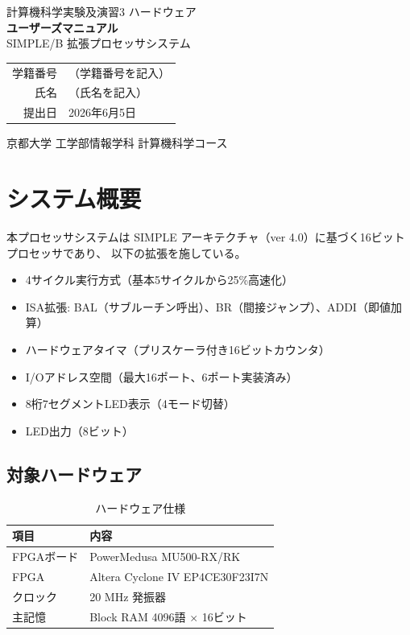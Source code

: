 \documentclass[a4paper,11pt]{ltjsarticle}
\begin{document}
\begin{titlepage}
\centering
\vspace*{3cm}
{\LARGE 計算機科学実験及演習3 ハードウェア}\\[1cm]
{\Huge\bfseries ユーザーズマニュアル}\\[0.5cm]
{\LARGE SIMPLE/B 拡張プロセッサシステム}\\[3cm]
\begin{tabular}{rl}
学籍番号 & （学籍番号を記入） \\[0.5em]
氏名     & （氏名を記入） \\[0.5em]
提出日   & 2026年6月5日 \\
\end{tabular}
\vfill
京都大学 工学部情報学科 計算機科学コース
\end{titlepage}

\tableofcontents
\clearpage


\section{システム概要}

本プロセッサシステムは SIMPLE アーキテクチャ（ver 4.0）に基づく16ビットプロセッサであり、
以下の拡張を施している。

\begin{itemize}
\item 4サイクル実行方式（基本5サイクルから25\%高速化）
\item ISA拡張: BAL（サブルーチン呼出）、BR（間接ジャンプ）、ADDI（即値加算）
\item ハードウェアタイマ（プリスケーラ付き16ビットカウンタ）
\item I/Oアドレス空間（最大16ポート、6ポート実装済み）
\item 8桁7セグメントLED表示（4モード切替）
\item LED出力（8ビット）
\end{itemize}

\subsection{対象ハードウェア}

\begin{table}[h]
\centering
\caption{ハードウェア仕様}
\begin{tabular}{ll}
\toprule
項目 & 内容 \\
\midrule
FPGAボード & PowerMedusa MU500-RX/RK \\
FPGA & Altera Cyclone IV EP4CE30F23I7N \\
クロック & 20 MHz 発振器 \\
主記憶 & Block RAM 4096語 $\times$ 16ビット \\
\bottomrule
\end{tabular}
\end{table}
\end{document}
